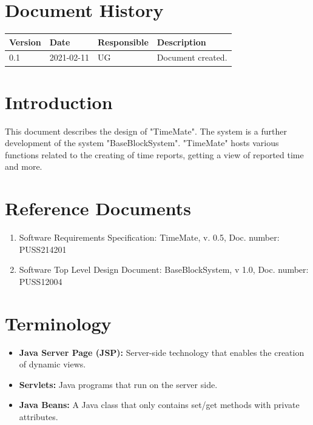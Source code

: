 \documentclass{article}
\date {#1}
\title {
    \documentNumber {01}    
    
    \documentVersion {0.1}
    
    \documentTitle {Software Top Level Design Document}
    \documentGroup {2}
    
    \documentResponsible {System Group}
    \documentAuthors {Developer Group}
    
    \documentDate {2021-02-11}
}
\begin{document}
\maketitle
\thispagestyle{empty}

\newpage

\tableofcontents

\newpage


\section{Document History}
\begin{tabular}{ l | l | l | l }
    Version & Date & Responsible & Description \\
    \hline
    0.1 & 2021-02-11 & UG & Document created. \\
\end{tabular}

\section{Introduction}
This document describes the design of "TimeMate". The system is a further development of the system "BaseBlockSystem". "TimeMate" hosts various functions related to the creating of time reports, getting a view of reported time and more.

\section{Reference Documents}
\begin{enumerate}
    \item Software Requirements Specification: TimeMate, v. 0.5, Doc. number: PUSS214201
    \item Software Top Level Design Document: BaseBlockSystem, v 1.0, Doc. number: PUSS12004
\end{enumerate}

\section{Terminology}
\begin{itemize}
\item \textbf{Java Server Page (JSP):} Server-side technology that enables the creation of dynamic views.
\item \textbf{Servlets:} Java programs that run on the server side.
\item \textbf{Java Beans:} A Java class that only contains set/get methods with private attributes.
\end{itemize}
\end{document}
